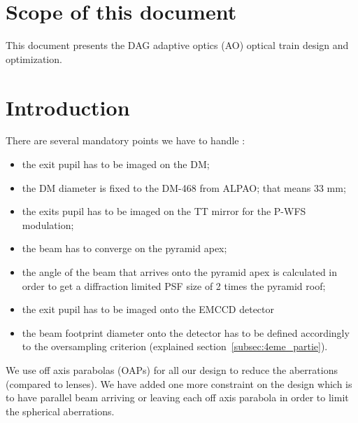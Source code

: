 \documentclass[12pt,a4paper]{article}
\begin{document}
\section{Scope of this document}

This document presents the DAG adaptive optics (AO) optical train design and optimization.

\section{Introduction}
There are several mandatory points we have to handle :
\begin{itemize}
	\item the exit pupil has to be imaged on the DM;
	\item the DM diameter is fixed to the DM-468 from ALPAO; that means \diameter $33$ mm;
	\item the exits pupil has to be imaged on the TT mirror for the P-WFS modulation;
	\item the beam has to converge on the pyramid apex;
	\item the angle of the beam that arrives onto the pyramid apex is calculated in order to get a diffraction limited PSF size of 2 times the pyramid roof;
	\item the exit pupil has to be imaged onto the EMCCD detector
	\item the beam footprint diameter onto the detector has to be defined accordingly to the oversampling criterion (explained section~\ref{subsec:4eme_partie}).
\end{itemize}

We use off axis parabolas (OAPs) for all our design to reduce the aberrations (compared to lenses).
We have added one more constraint on the design which is to have parallel beam arriving or leaving each off axis parabola in order to limit the spherical aberrations.\\
\end{document}
